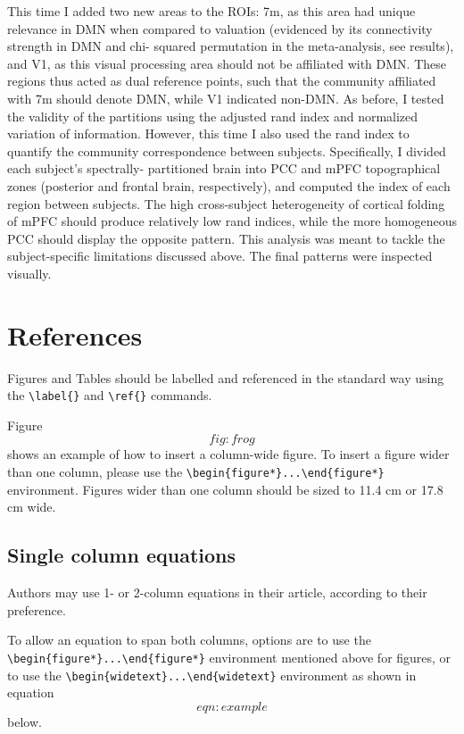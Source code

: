 \documentclass[9pt,twocolumn,twoside,]{pnas-new}
\begin{document}
This time I added two new areas to the ROIs: 7m, as this area had unique
relevance in DMN when compared to valuation (evidenced by its
connectivity strength in DMN and chi- squared permutation in the
meta-analysis, see results), and V1, as this visual processing area
should not be affiliated with DMN. These regions thus acted as dual
reference points, such that the community affiliated with 7m should
denote DMN, while V1 indicated non-DMN. As before, I tested the validity
of the partitions using the adjusted rand index and normalized variation
of information. However, this time I also used the rand index to
quantify the community correspondence between subjects. Specifically, I
divided each subject's spectrally- partitioned brain into PCC and mPFC
topographical zones (posterior and frontal brain, respectively), and
computed the index of each region between subjects. The high
cross-subject heterogeneity of cortical folding of mPFC should produce
relatively low rand indices, while the more homogeneous PCC should
display the opposite pattern. This analysis was meant to tackle the
subject-specific limitations discussed above. The final patterns were
inspected visually.

\section*{References}\label{references}

Figures and Tables should be labelled and referenced in the standard way
using the \texttt{\textbackslash{}label\{\}} and
\texttt{\textbackslash{}ref\{\}} commands.

Figure \[fig:frog\] shows an example of how to insert a column-wide
figure. To insert a figure wider than one column, please use the
\texttt{\textbackslash{}begin\{figure*\}...\textbackslash{}end\{figure*\}}
environment. Figures wider than one column should be sized to 11.4 cm or
17.8 cm wide.

\subsection*{Single column equations}\label{single-column-equations}

Authors may use 1- or 2-column equations in their article, according to
their preference.

To allow an equation to span both columns, options are to use the
\texttt{\textbackslash{}begin\{figure*\}...\textbackslash{}end\{figure*\}}
environment mentioned above for figures, or to use the
\texttt{\textbackslash{}begin\{widetext\}...\textbackslash{}end\{widetext\}}
environment as shown in equation \[eqn:example\] below.
\end{document}
